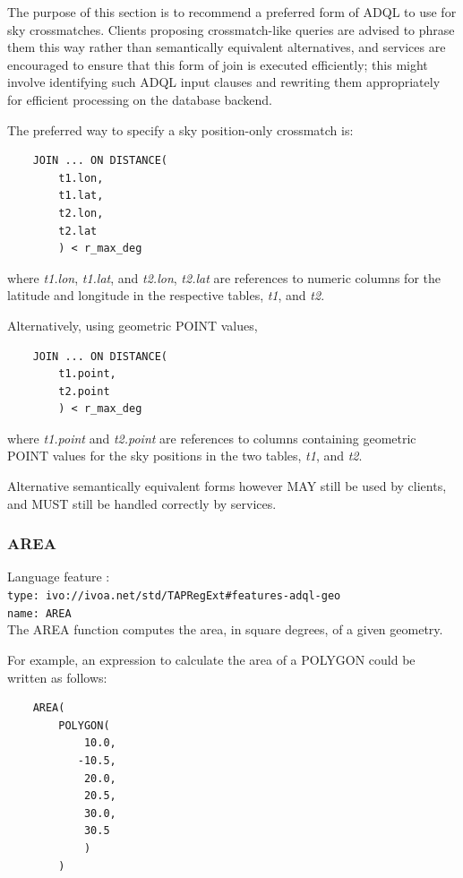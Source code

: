 \documentclass[11pt,a4paper]{ivoa}
\begin{document}
The purpose of this section is to recommend a preferred form of ADQL
to use for sky crossmatches.  Clients proposing crossmatch-like
queries are advised to phrase them this way rather than semantically
equivalent alternatives, and services are encouraged to ensure that
this form of join is executed efficiently; this might involve 
identifying such ADQL input clauses and rewriting them appropriately 
for efficient processing on the database backend.

The preferred way to specify a sky position-only crossmatch is:
\begin{verbatim}
    JOIN ... ON DISTANCE(
        t1.lon,
        t1.lat,
        t2.lon,
        t2.lat
        ) < r_max_deg
\end{verbatim}
where \textit{t1.lon}, \textit{t1.lat}, and \textit{t2.lon}, \textit{t2.lat}
are references to numeric columns for the latitude and longitude
in the respective tables, \textit{t1}, and \textit{t2}.

Alternatively, using geometric POINT values,
\begin{verbatim}
    JOIN ... ON DISTANCE(
        t1.point,
        t2.point
        ) < r_max_deg
\end{verbatim}
where \textit{t1.point} and \textit{t2.point}
are references to columns containing geometric POINT values
for the sky positions in the two tables, \textit{t1}, and \textit{t2}.

Alternative semantically equivalent forms however MAY still be
used by clients, and MUST still be handled correctly by services.

\subsubsection{AREA}
\label{sec:functions.geom.area}
{\footnotesize Language feature :}\\
{\footnotesize \verb|type: ivo://ivoa.net/std/TAPRegExt#features-adql-geo|}\\
{\footnotesize \verb|name: AREA|}\\

The AREA function computes the area, in square degrees, of a given geometry.

For example, an expression to calculate the area of a POLYGON could be
written as follows:
\begin{verbatim}
    AREA(
        POLYGON(
            10.0,
           -10.5,
            20.0,
            20.5,
            30.0,
            30.5
            )
        )
\end{verbatim}
\end{document}
